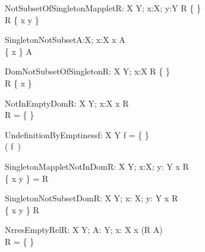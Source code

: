 \begin{theorem}{NotSubsetOfSingletonMapplet}{R: X \rel Y; x:X; y:Y}
R \neq \{ \} \\
\dom R \subset \dom \{ x \mapsto y \} 
\end{theorem}

\begin{theorem}{SingletonNotSubset}{A:\power X; x:X}
x \notin A \\
\{ x \} \subset A
\end{theorem}

\begin{theorem}{DomNotSubsetOfSingleton}{R: X \rel Y; x:X}
R \neq \{ \} \\
\dom R \subset \{ x \} 
\end{theorem}

\begin{theorem}{NotInEmptyDom}{R: X \rel Y; x:X}
x \in \dom R \\
R = \{ \}
\end{theorem}




\begin{theorem}{UndefinitionByEmptiness}{f: X \pfun Y}
f = \{ \} \\
\sw( f~\anything ) \\
\end{theorem}

\begin{theorem}{SingletonMappletNotInDom}{R: X \rel Y; x:X; y: Y}
x \notin \dom R \\
\dom \{ x \mapsto y \} = \dom R
\end{theorem}

\begin{theorem}{SingletonNotSubsetDom}{R: X \rel Y; x: X; y: Y}
x \notin \dom R \\
\dom \{ x \mapsto y \} \subset \dom R
\end{theorem}


\begin{theorem}{NrresEmptyRel}{R: X \rel Y; A: \power Y; x: X}
x \in \dom (R \nrres A) \\
R = \{ \}
\end{theorem}

